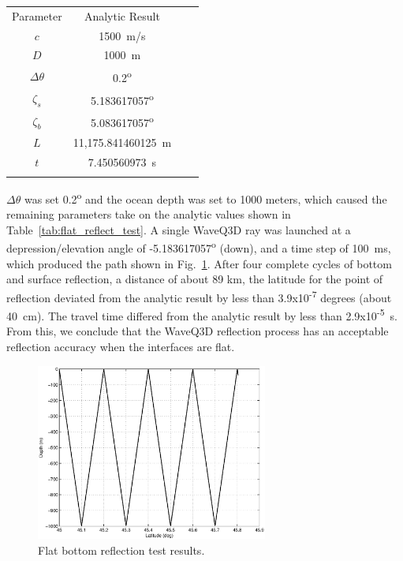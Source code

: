 \documentclass{ws-jca}
\begin{document}
\begin{table}[th]
	{\begin{tabular}{@{}cccc@{}} \toprule
		Parameter & Analytic Result \\ \colrule
		\( c \) & 1500~m/s \\
		\( D \) & 1000~m \\
		\( \Delta \theta \) & 0.2\textsuperscript{o} \\
		\( \zeta_s \) & 5.183617057\textsuperscript{o} \\
		\( \zeta_b \) & 5.083617057\textsuperscript{o} \\
		\( L \) & 11,175.841460125~m \\
		\( t \) & 7.450560973~s \\ \botrule
	\end{tabular}}
\end{table}
\( \Delta\theta \) was set 0.2\textsuperscript{o} and the ocean depth was
set to 1000 meters, which caused the remaining parameters take on the
analytic values shown in Table~\ref{tab:flat_reflect_test}. A single
WaveQ3D ray was launched at a depression/elevation angle of
-5.183617057\textsuperscript{o} (down), and a time step of 100~ms, which
produced the path shown in Fig.~\ref{fig:reflect_flat_test}. After four
complete cycles of bottom and surface reflection, a distance of about 89
km, the latitude for the point of reflection deviated from the analytic
result by less than 3.9x10\textsuperscript{-7} degrees (about 40~cm). The
travel time differed from the analytic result by less than
2.9x10\textsuperscript{-5}~s. From this, we conclude that the WaveQ3D
reflection process has an acceptable reflection accuracy when the
interfaces are flat.
\begin{figure}[th]
	\centerline{\includegraphics[width=3in]{reflect_flat_test.eps}} 
	\vspace*{8pt}
	\caption{Flat bottom reflection test results.  
	\label{fig:reflect_flat_test}}
\end{figure}
\end{document}
